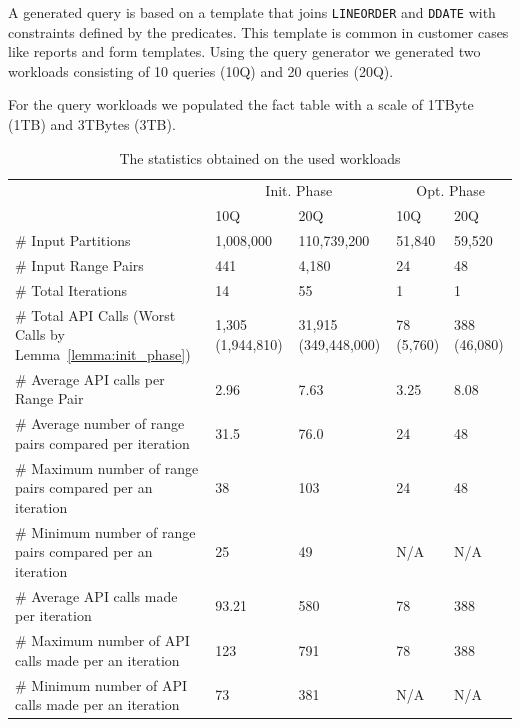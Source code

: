 \documentclass[runningheads]{comsis2}
\begin{document}
A generated query is based on a template that joins {\tt LINEORDER} and {\tt DDATE} with constraints defined by the predicates. 
This template is common in customer cases like reports and form 
templates. 
Using the query generator we generated two workloads consisting of 10 queries (10Q) and 20 queries (20Q). 

For the query workloads we populated the fact table with a scale of 1TByte (1TB) and 3TBytes (3TB).

\begin{table}[t]
\caption{The statistics obtained on the used workloads\label{tab:workload_stat}}
\begin{center}
{\scriptsize
\begin{tabular}{|l|l|l|l|l|} \hline
		   			   							   & \multicolumn{2}{|c|}{Init. Phase} & \multicolumn{2}{|c|}{Opt. Phase} \\ \cline{2-5}
		   			   							   & 10Q & 20Q & 10Q & 20Q \\ \hline
{\# Input Partitions}  							   & 1,008,000 & 110,739,200 & 51,840 & 59,520 \\ \hline
{\# Input Range Pairs} 							   & 441 & 4,180 & 24 & 48\\ \hline
{\# Total Iterations}  							   & 14 & 55 & 1 & 1 \\ \hline
{\# Total API Calls (Worst Calls by Lemma~\ref{lemma:init_phase}})   & 1,305 (1,944,810) & 31,915 (349,448,000) & 78 (5,760) & 388 (46,080) \\ \hline
{\# Average API calls per Range Pair} 		  	   & 2.96 & 7.63 & 3.25 & 8.08 \\ \hline
{\# Average number of range pairs compared per iteration} 	   & 31.5 & 76.0 & 24 & 48 \\ \hline
{\# Maximum number of range pairs compared per an iteration} & 38 & 103 & 24 & 48 \\ \hline
{\# Minimum number of range pairs compared per an iteration} & 25 & 49 & N/A & N/A\\ \hline
{\# Average API calls made per iteration}		   & 93.21 & 580 & 78 & 388 \\ \hline
{\# Maximum number of API calls made per an iteration} 	   & 123 & 791 & 78 & 388 \\ \hline
{\# Minimum number of API calls made per an iteration} 	   & 73 & 381 & N/A & N/A \\ \hline
\end{tabular}
}
\end{center}
\vspace{-0.3in}
\end{table}
\end{document}
